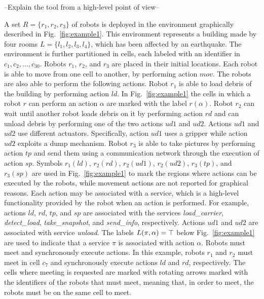 --Explain the tool from a high-level point of view--

A set $R=\{r_1, r_2, r_3 \}$ of robots  is deployed in the environment graphically described in  Fig.~\ref{fig:example1}.
This environment represents a building made by four rooms $L=\{ l_1, l_2, l_3, l_4 \}$, which has been affected by an earthquake.
The environment is further partitioned in cells, each labeled with an identifier in $c_1, c_2, \ldots, c_{30}$.
Robots $r_1$, $r_2$, and $r_3$ are placed in their initial locations.
Each robot is able to move from one cell to another, by performing action $mov$.
The robots are also able to perform the following actions.
Robot $r_1$ is able to load debris of the building by performing action $ld$. 
In Fig.~\ref{fig:example1} the cells in which a robot $r$ can perform an action $\alpha$ are marked with the label $r(\alpha)$.
Robot $r_2$ can wait until another robot loads debris on it by performing action $rd$ and can unload debris by performing one of the two actions $ud1$ and $ud2$. 
Actions $ud1$ and $ud2$ use different actuators.
Specifically, action $ud1$ uses a gripper while action $ud2$ exploits a dump mechanism.
Robot $r_3$ is able to take pictures by performing action $tp$ and send them using a communication network through the execution of action $sp$. 
Symbols $r_1(ld)$, $r_2(rd)$, $r_2(ud1)$, $r_2(ud2)$, $r_3(tp)$, and $r_3(sp)$ are used in Fig.~\ref{fig:example1} to mark the regions where  actions can be executed by the robots, while movement actions are not reported for graphical reasons.
Each action may be associated with a service, which is a high-level functionality provided by the robot when an action is performed.
For example, actions $ld$, $rd$, $tp$, and $sp$  are associated with the services \emph{load\_carrier}, \emph{detect\_load}, \emph{take\_snapshot}, and \emph{send\_info}, respectively.
Actions $ud1$ and $ud2$ are associated with service \emph{unload}.
The labels $L(\pi,\alpha)=\top$ below Fig.~\ref{fig:example1} are used to indicate that a service $\pi$ is associated with  action $\alpha$. 
Robots must meet and  synchronously execute actions. 
In this example, robots $r_1$ and  $r_2$ must meet  in cell $c_7$ and synchronously execute actions $ld$ and $rd$, respectively. 
The cells where meeting is requested are marked with rotating arrows marked with the identifiers of the robots that must meet, meaning that, in order to meet, the robots must be on the same cell to meet.


